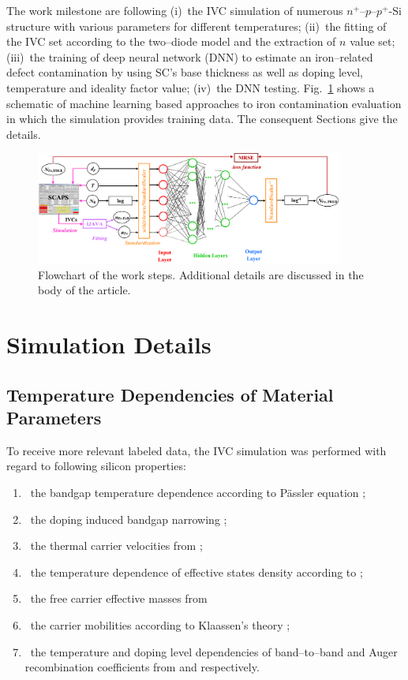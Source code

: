 \documentclass[journal]{IEEEtran}
\begin{document}
The work milestone are following
(i)~the IVC simulation of numerous $n^+$--$p$--$p^+$-Si structure with various parameters for different temperatures;
(ii)~the fitting of the IVC set according to the two--diode model and the extraction of $n$ value set;
(iii)~the training of deep neural network (DNN) to estimate an iron--related defect contamination  by using SC's base thickness as well as doping level,
temperature and ideality factor value;
(iv)~the DNN testing.
Fig.~\ref{fig_chem} shows a schematic of machine learning based approaches to iron contamination evaluation in which the simulation provides training data.
The consequent Sections give the details.

\begin{figure}[tb]
\centering
\includegraphics[width=0.9\textwidth]{Chem}
\caption{Flowchart of the work  steps.
Additional details are discussed in the body of the article.}
\label{fig_chem}
\end{figure}


\section{Simulation Details}

\subsection{Temperature Dependencies of Material Parameters}

To receive more relevant labeled data, the IVC simulation was performed with regard to following silicon properties:
\begin{enumerate}
  \item~the bandgap temperature dependence according to P\"assler equation \cite{Pasler};
  \item~the doping induced bandgap narrowing \cite{EgNarrow};
  \item~the thermal carrier velocities from \cite{Nc:Green};
  \item~the temperature dependence of effective states density  according to \cite{Si_ni_Couderc};
  \item~the free carrier effective masses from \cite{OMara}
  \item~the carrier mobilities according to Klaassen's theory  \cite{KLAASSEN953};
  \item~the temperature and doping level dependencies of band--to--band and Auger recombination coefficients from \cite{Si_BtB} and \cite{Si_Auger} respectively.
\end{enumerate}
\end{document}

